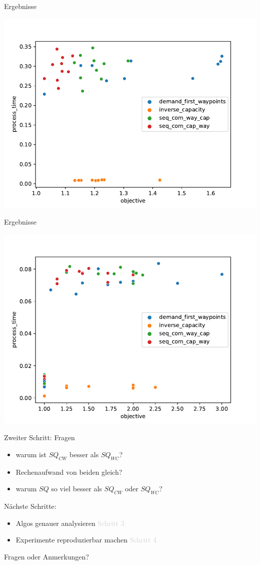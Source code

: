 \documentclass[aspectratio=169,10pt]{beamer}
\begin{document}
\begin{frame}{Ergebnisse}
\begin{center}
\includegraphics[width=.8\textwidth]{images/pouria_colored_scatter_plot_results_real_demands.pdf}
\end{center}
\end{frame}
\begin{frame}{Ergebnisse}
\begin{center}
\includegraphics[width=.8\textwidth]{images/pouria_colored_scatter_plot_results_all_topologies.pdf}
\end{center}
\end{frame}
\begin{frame}{Zweiter Schritt: Fragen}
\Large
\begin{itemize}
    \item warum ist $SQ_{CW}$ besser als $SQ_{WC}$?
    \item Rechenaufwand von beiden gleich?
    \item warum $SQ$ so viel besser als $SQ_{CW}$ oder $SQ_{WC}$?
\end{itemize}
N\"achste Schritte:
\begin{itemize}
    \item Algos genauer analysieren \textcolor{lightgray}{Schritt 3}
    \item Experimente reproduzierbar machen \textcolor{lightgray}{Schritt 4}
\end{itemize}
\end{frame}
\begin{frame}[t,standout]
\Large
Fragen oder Anmerkungen?
\end{frame}
\end{document}
